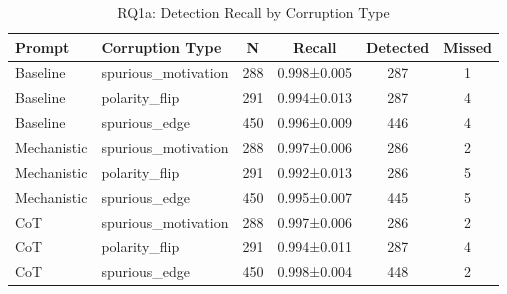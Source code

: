 \begin{table}[htbp]
\centering
\caption{RQ1a: Detection Recall by Corruption Type}
\label{tab:rq1a_corruption_type}
\begin{tabular}{llcccc}
\toprule
\textbf{Prompt} & \textbf{Corruption Type} & \textbf{N} & \textbf{Recall} & \textbf{Detected} & \textbf{Missed} \\
\midrule
Baseline & spurious_motivation & 288 & 0.998±0.005 & 287 & 1 \\
Baseline & polarity_flip & 291 & 0.994±0.013 & 287 & 4 \\
Baseline & spurious_edge & 450 & 0.996±0.009 & 446 & 4 \\
Mechanistic & spurious_motivation & 288 & 0.997±0.006 & 286 & 2 \\
Mechanistic & polarity_flip & 291 & 0.992±0.013 & 286 & 5 \\
Mechanistic & spurious_edge & 450 & 0.995±0.007 & 445 & 5 \\
CoT & spurious_motivation & 288 & 0.997±0.006 & 286 & 2 \\
CoT & polarity_flip & 291 & 0.994±0.011 & 287 & 4 \\
CoT & spurious_edge & 450 & 0.998±0.004 & 448 & 2 \\
\bottomrule
\end{tabular}
\end{table}